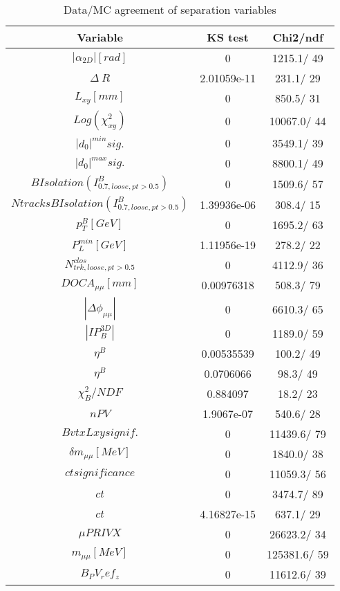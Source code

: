 \documentclass{article}
\begin{document}
\begin{table}[htbp]
\caption{\label{tab:sepVars}Data/MC agreement of separation variables}
\begin{center}
\begin{tabular}{c|c|c}
Variable & KS test & Chi2/ndf \\
\hline
$|\alpha_{2D}| [rad]$ & 0 & 1215.1/ 49\\
\hline
$\Delta~R$ & 2.01059e-11 & 231.1/ 29\\
\hline
$L_{xy} [mm]$ & 0 & 850.5/ 31\\
\hline
$Log(\chi^{2}_{xy})$ & 0 & 10067.0/ 44\\
\hline
$|d_{0}|^{min} sig.$ & 0 & 3549.1/ 39\\
\hline
$|d_{0}|^{max} sig.$ & 0 & 8800.1/ 49\\
\hline
$B Isolation (I^{B}_{0.7, loose, pt>0.5})$ & 0 & 1509.6/ 57\\
\hline
$Ntracks B Isolation (I^{B}_{0.7, loose, pt>0.5})$ & 1.39936e-06 & 308.4/ 15\\
\hline
$p_{T}^{B} [GeV]$ & 0 & 1695.2/ 63\\
\hline
$P^{min}_{L} [GeV]$ & 1.11956e-19 & 278.2/ 22\\
\hline
$N^{clos}_{trk, loose, pt>0.5}$ & 0 & 4112.9/ 36\\
\hline
$DOCA_{\mu\mu} [mm]$ & 0.00976318 & 508.3/ 79\\
\hline
$|\Delta\phi_{\mu\mu}|$ & 0 & 6610.3/ 65\\
\hline
$|IP_{B}^{3D}|$ & 0 & 1189.0/ 59\\
\hline
$\eta^{B}$ & 0.00535539 & 100.2/ 49\\
\hline
$\eta^{B}$ & 0.0706066 &  98.3/ 49\\
\hline
$\chi^{2}_{B}/NDF$ & 0.884097 &  18.2/ 23\\
\hline
$nPV$ & 1.9067e-07 & 540.6/ 28\\
\hline
$BvtxLxy signif.$ & 0 & 11439.6/ 79\\
\hline
$\delta m_{\mu\mu} [MeV]$ & 0 & 1840.0/ 38\\
\hline
$ct significance$ & 0 & 11059.3/ 56\\
\hline
$ct$ & 0 & 3474.7/ 89\\
\hline
$ct$ & 4.16827e-15 & 637.1/ 29\\
\hline
$\mu PRIVX$ & 0 & 26623.2/ 34\\
\hline
$m_{\mu\mu} [MeV]$ & 0 & 125381.6/ 59\\
\hline
$B_PV_ref_z$ & 0 & 11612.6/ 39\\

\end{tabular}
\end{center}
\end{table}
\end{document}
